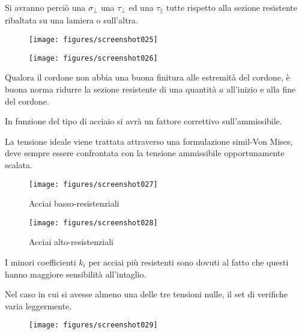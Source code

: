 \documentclass[a4paper, 15pt]{article}
\begin{document}
\begin{adjustwidth}{2in}{}
   Si avranno perciò una $\sigma_{\perp}$ una $\tau_{\perp}$ ed una $\tau_{\parallel}$ tutte rispetto alla  sezione resistente ribaltata su una lamiera o sull'altra.
   \begin{figure}[H]
   	\centering
   	\texttt{[image: figures/screenshot025]}
   	\label{fig:screenshot025}
   \end{figure}
   \begin{figure}[H]
   	\centering
   	\texttt{[image: figures/screenshot026]}
   	\label{fig:screenshot026}
   \end{figure}
   Qualora il cordone non abbia una buona finitura alle estremità del cordone, è buona norma ridurre la sezione resistente di una quantità $a$ all'inizio e alla fine del cordone. \newline 
   
   In funzione  del tipo di acciaio si avrà un fattore correttivo sull'ammissibile. 
   
   La tensione ideale viene trattata attraverso una formulazione simil-Von Mises, deve sempre essere confrontata con la tensione ammissibile opportunamente scalata. 
   \begin{figure}[H]
   	\parbox{0.45\textwidth}{\centering
   	\texttt{[image: figures/screenshot027]}
   	\caption{Acciai basso-resistenziali}
   	\label{fig:screenshot027}}
   	\parbox{0.45\textwidth}{\centering
   	\texttt{[image: figures/screenshot028]}
   	\caption{Acciai alto-resistenziali}
   	\label{fig:screenshot028}}
   \end{figure}
   I minori coefficienti $k_i$ per acciai più resistenti sono dovuti al fatto che questi hanno maggiore sensibilità all'intaglio. 
   
 \newpage
 
 Nel caso in cui si avesse  almeno una delle tre tensioni nulle, il set di verifiche varia leggermente. 
 \begin{figure}[H]
 	\centering
 	\texttt{[image: figures/screenshot029]}
 	\label{fig:screenshot029}
 \end{figure}
\end{adjustwidth}
\newpage
\end{document}
